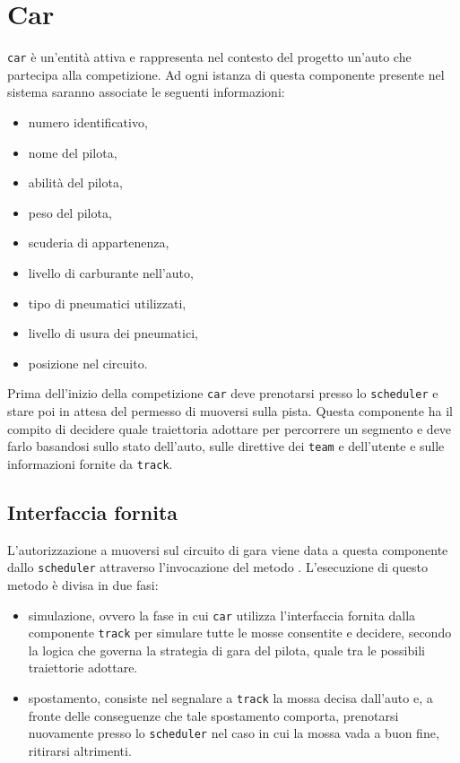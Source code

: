 \section{Car}
\texttt{car} è un'entità attiva e rappresenta nel contesto del progetto un'auto che partecipa alla competizione. Ad ogni istanza di questa componente presente nel sistema saranno associate le seguenti informazioni:
\begin{itemize}
\item numero identificativo,
\item nome del pilota,
\item abilità del pilota,
\item peso del pilota,
\item scuderia di appartenenza,
\item livello di carburante nell'auto,
\item tipo di pneumatici utilizzati,
\item livello di usura dei pneumatici,
\item posizione nel circuito.
\end{itemize}
Prima dell'inizio della competizione \texttt{car} deve prenotarsi presso lo \texttt{scheduler} e stare poi in attesa del permesso di muoversi sulla pista.
Questa componente ha il compito di decidere quale traiettoria adottare per percorrere un segmento e deve farlo basandosi sullo stato dell'auto, sulle direttive dei \texttt{team} e dell'utente e sulle informazioni fornite da \texttt{track}.

\subsection*{Interfaccia fornita}
L'autorizzazione a muoversi sul circuito di gara viene data a questa componente dallo \texttt{scheduler} attraverso l'invocazione del metodo . L'esecuzione di questo metodo è divisa in due fasi:
\begin{itemize}
\item simulazione, ovvero la fase in cui \texttt{car} utilizza l'interfaccia fornita dalla componente \texttt{track} per simulare tutte le mosse consentite e decidere, secondo la logica che governa la strategia di gara del pilota, quale tra le possibili traiettorie adottare.
\item spostamento, consiste nel segnalare a \texttt{track} la mossa decisa dall'auto e, a fronte delle conseguenze che tale spostamento comporta, prenotarsi nuovamente presso lo \texttt{scheduler} nel caso in cui la mossa vada a buon fine, ritirarsi altrimenti.
\end{itemize}

